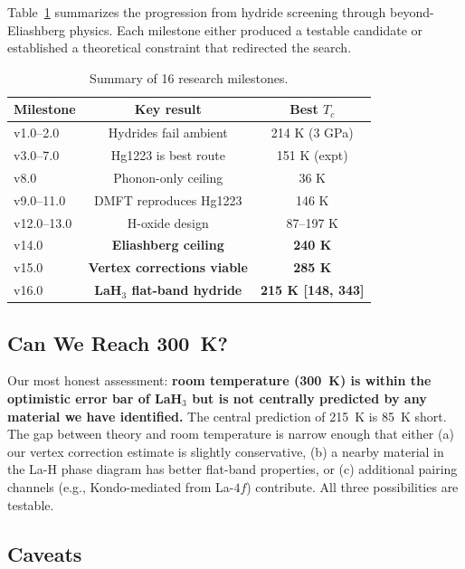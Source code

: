 \documentclass[aps,prb,reprint,superscriptaddress,longbibliography]{revtex4-2}
\begin{document}
Table~\ref{tab:milestones} summarizes the progression from hydride screening through beyond-Eliashberg physics. Each milestone either produced a testable candidate or established a theoretical constraint that redirected the search.

\begin{table}[h]
\caption{Summary of 16 research milestones.}
\label{tab:milestones}
\begin{ruledtabular}
\begin{tabular}{lcc}
Milestone & Key result & Best $T_c$ \\
\hline
v1.0--2.0 & Hydrides fail ambient & 214 K (3 GPa) \\
v3.0--7.0 & Hg1223 is best route & 151 K (expt) \\
v8.0 & Phonon-only ceiling & 36 K \\
v9.0--11.0 & DMFT reproduces Hg1223 & 146 K \\
v12.0--13.0 & H-oxide design & 87--197 K \\
v14.0 & \textbf{Eliashberg ceiling} & \textbf{240 K} \\
v15.0 & \textbf{Vertex corrections viable} & \textbf{285 K} \\
v16.0 & \textbf{LaH$_3$ flat-band hydride} & \textbf{215 K [148, 343]} \\
\end{tabular}
\end{ruledtabular}
\end{table}

\subsection{Can We Reach 300~K?}

Our most honest assessment: \textbf{room temperature (300~K) is within the optimistic error bar of LaH$_3$ but is not centrally predicted by any material we have identified.} The central prediction of 215~K is 85~K short. The gap between theory and room temperature is narrow enough that either (a) our vertex correction estimate is slightly conservative, (b) a nearby material in the La-H phase diagram has better flat-band properties, or (c) additional pairing channels (e.g., Kondo-mediated from La-$4f$) contribute. All three possibilities are testable.

\subsection{Caveats}
\end{document}
